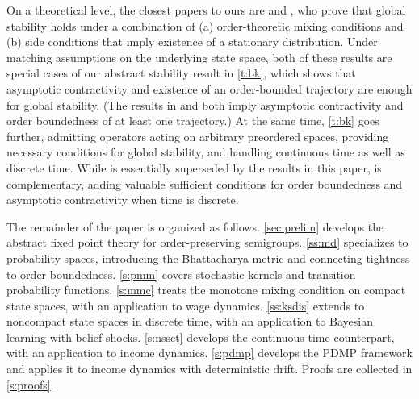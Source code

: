 \documentclass[12pt,reqno]{amsart}
\numberwithin{equation}{section}
\theoremstyle{definition}
\newcommand{\1}{\mathbbm{1}}
\begin{document}
On a theoretical level, the closest papers to ours are
\cite{kamihigashi2014stochastic} and \cite{foss2024compressibility}, who prove
that global stability holds under a combination of (a) order-theoretic mixing
conditions and (b) side conditions that imply existence of a stationary
distribution. Under matching assumptions on the underlying state space, both of
these results are special cases of our abstract stability result in \cref{t:bk},
which shows that asymptotic contractivity and existence of an order-bounded
trajectory are enough for global stability.  (The results in
\cite{kamihigashi2014stochastic} and \cite{foss2024compressibility} both imply
asymptotic contractivity and order boundedness of at least one trajectory.) At
the same time, \cref{t:bk} goes further, admitting operators acting on arbitrary
preordered spaces, providing necessary conditions for global stability, and
handling continuous time as well as discrete time.  While
\cite{kamihigashi2014stochastic} is essentially superseded by the results in
this paper, \cite{foss2024compressibility} is complementary, adding valuable
sufficient conditions for order boundedness and asymptotic contractivity when
time is discrete.


The remainder of the paper is organized as follows. \cref{sec:prelim}
develops the abstract fixed point theory for order-preserving semigroups.
\cref{ss:md} specializes to probability spaces, introducing the
Bhattacharya metric and connecting tightness to order boundedness.
\cref{s:pmm} covers stochastic kernels and transition probability functions.
\cref{s:mmc} treats the monotone mixing condition on compact state spaces,
with an application to wage dynamics. \cref{ss:ksdis} extends to noncompact
state spaces in discrete time, with an application to Bayesian learning
with belief shocks. \cref{s:nssct} develops the continuous-time
counterpart, with an application to income dynamics. \cref{s:pdmp}
develops the PDMP framework and applies it to income dynamics with
deterministic drift. Proofs are collected in \cref{s:proofs}.


\end{document}
